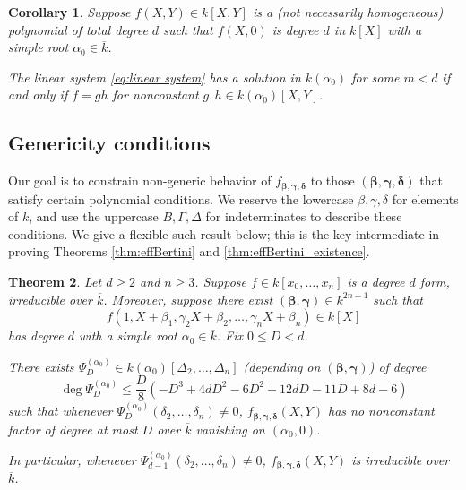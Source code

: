 \documentclass{amsart}
\renewcommand{\v}{\beta}
\newcommand{\w}{\gamma}
\newcommand{\z}{\delta}
\newcommand{\vvar}{B}
\newcommand{\wvar}{\Gamma}
\newcommand{\zvar}{\Delta}
\newcommand{\bv}{\boldsymbol{\v}}
\newcommand{\bw}{\boldsymbol{\w}}
\newcommand{\bz}{\boldsymbol{\z}}
\newcommand{\fvwz}{f_{\bv, \bw, \bz}}
\newtheorem{theorem}{Theorem}[section]
\newtheorem{corollary}[theorem]{Corollary}
\theoremstyle{definition}
\numberwithin{equation}{section}
\numberwithin{table}{section}
\begin{document}
\begin{corollary}
\label{cor:linear_systems_reducibility}
    Suppose $f(X,Y) \in k[X,Y]$ is a (not necessarily homogeneous) polynomial of total degree $d$ such that $f(X,0)$ is degree $d$ in $k[X]$ with a simple root $\alpha_0 \in \overline{k}$. 

   The linear system \eqref{eq:linear system} has a solution in $k(\alpha_0)$ for some $m < d$ if and only if $f = gh$ for nonconstant $g,h \in k(\alpha_0)[X,Y]$.
\end{corollary}


\subsection{Genericity conditions}
\label{sec:genericity}

Our goal is to constrain non-generic behavior of $\fvwz$ to those $(\bv,\bw,\bz)$ that satisfy certain polynomial conditions. We reserve the lowercase $\v,\w,\z$ for elements of $k$, and use the uppercase $\vvar, \wvar, \zvar$ for indeterminates to describe these conditions. We give a flexible such result below; this is the key intermediate in proving Theorems \ref{thm:effBertini} and \ref{thm:effBertini_existence}. 

\begin{theorem}
\label{thm:effBertini_modified}
	Let $d \geq 2$ and $n \geq 3$. Suppose $f \in k[x_0,\ldots,x_n]$ is a degree $d$ form, irreducible over $\overline{k}$. Moreover, suppose there exist $(\bv, \bw) \in k^{2n-1}$ such that
	\[f(1,X + \v_1, \w_2X + \v_2, \ldots, \w_nX + \v_n) \in k[X]\]
   	has degree $d$ with a simple root $\alpha_0 \in \overline{k}$. Fix $0 \leq D < d$. 
   	
   	There exists $\Psi_D^{(\alpha_0)} \in k(\alpha_0)[\zvar_2, \ldots, \zvar_n]$ (depending on $(\bv, \bw)$) of degree
    \[\deg \Psi_D^{(\alpha_0)} \leq \frac{D}{8} \left(-D^3 + 4dD^2 - 6D^2 + 12dD - 11D + 8d - 6\right)\]
    such that whenever $\Psi_D^{(\alpha_0)}(\z_2,\ldots,\z_n) \neq 0$, $f_{\bv, \bw, \bz}(X,Y)$ has no nonconstant factor of degree at most $D$ over $\overline{k}$ vanishing on $(\alpha_0, 0)$.
    
    In particular, whenever $\Psi_{d-1}^{(\alpha_0)}(\z_2,\ldots,\z_n) \neq 0$, $\fvwz(X,Y)$ is irreducible over $\overline{k}$.
\end{theorem}
\end{document}
